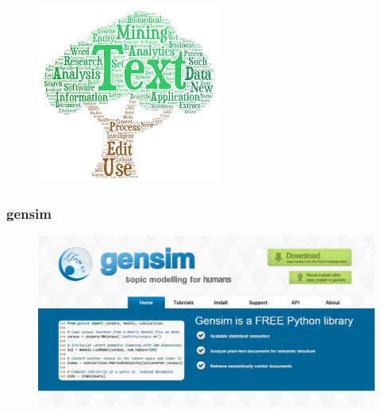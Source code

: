 \documentclass[MASTER.tex]{subfiles}
\begin{document}
\begin{frame}
\begin{figure}
\centering
\includegraphics[width=0.75\linewidth]{testmining}

\end{figure}
	
	
\end{frame}
\begin{frame}
	\frametitle{gensim}
	\begin{figure}
		\centering
		\includegraphics[width=1.05\linewidth]{gensim}

	\end{figure}
\end{frame}
\end{document}

